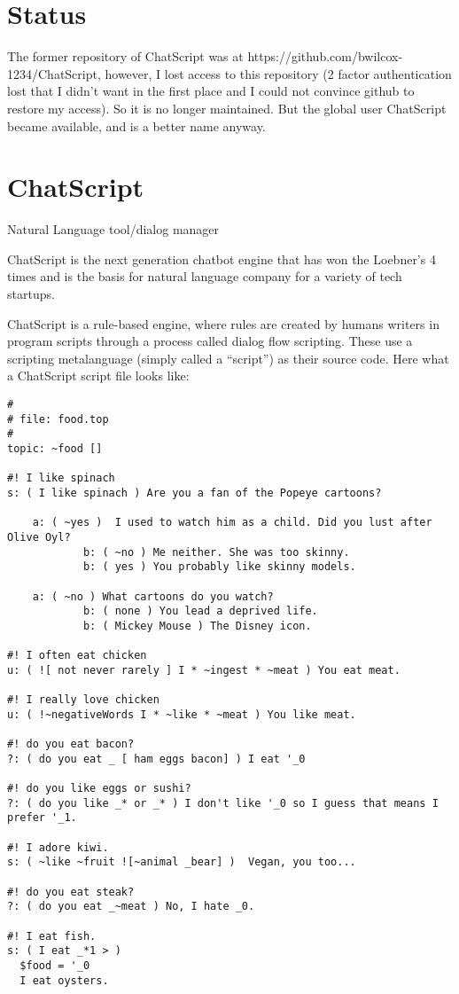 \documentclass[]{article}
\date{}
\begin{document}
\section{Status}\label{status}

The former repository of ChatScript was at
https://github.com/bwilcox-1234/ChatScript, however, I lost access to
this repository (2 factor authentication lost that I didn't want in the
first place and I could not convince github to restore my access). So it
is no longer maintained. But the global user ChatScript became
available, and is a better name anyway.

\section{ChatScript}\label{chatscript}

Natural Language tool/dialog manager

ChatScript is the next generation chatbot engine that has won the
Loebner's 4 times and is the basis for natural language company for a
variety of tech startups.

ChatScript is a rule-based engine, where rules are created by humans
writers in program scripts through a process called dialog flow
scripting. These use a scripting metalanguage (simply called a
``script'') as their source code. Here what a ChatScript script file
looks like:

\begin{verbatim}
#
# file: food.top
#
topic: ~food []

#! I like spinach
s: ( I like spinach ) Are you a fan of the Popeye cartoons?
    
    a: ( ~yes )  I used to watch him as a child. Did you lust after Olive Oyl?
            b: ( ~no ) Me neither. She was too skinny.
            b: ( yes ) You probably like skinny models.
    
    a: ( ~no ) What cartoons do you watch?
            b: ( none ) You lead a deprived life.
            b: ( Mickey Mouse ) The Disney icon.

#! I often eat chicken
u: ( ![ not never rarely ] I * ~ingest * ~meat ) You eat meat.

#! I really love chicken
u: ( !~negativeWords I * ~like * ~meat ) You like meat.

#! do you eat bacon?
?: ( do you eat _ [ ham eggs bacon] ) I eat '_0

#! do you like eggs or sushi?
?: ( do you like _* or _* ) I don't like '_0 so I guess that means I prefer '_1.

#! I adore kiwi.
s: ( ~like ~fruit ![~animal _bear] )  Vegan, you too...

#! do you eat steak?
?: ( do you eat _~meat ) No, I hate _0.

#! I eat fish.
s: ( I eat _*1 > ) 
  $food = '_0 
  I eat oysters.
\end{verbatim}
\end{document}
